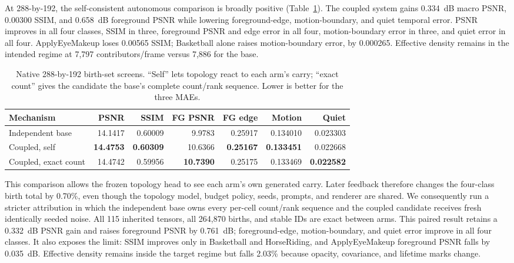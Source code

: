 \documentclass[10pt]{article}
\begin{document}
At 288-by-192, the self-consistent autonomous comparison is broadly positive
(Table~\ref{tab:coupledset}). The coupled system gains \SI{0.334}{dB} macro PSNR, 0.00300 SSIM,
and \SI{0.658}{dB} foreground PSNR while lowering foreground-edge, motion-boundary, and quiet
temporal error. PSNR improves in all four classes, SSIM in three, foreground PSNR and edge error in
all four, motion-boundary error in three, and quiet error in all four. ApplyEyeMakeup loses 0.00565
SSIM; Basketball alone raises motion-boundary error, by 0.000265. Effective density remains in the
intended regime at 7,797 contributors/frame versus 7,886 for the base.

\begin{table}[H]
\centering
\small
\caption{Native 288-by-192 birth-set screens. ``Self'' lets topology react to each arm's carry;
``exact count'' gives the candidate the base's complete count/rank sequence. Lower is better for
the three MAEs.}
\label{tab:coupledset}
\begin{tabular}{@{}lrrrrrr@{}}
\toprule
Mechanism & PSNR & SSIM & FG PSNR & FG edge & Motion & Quiet \\
\midrule
Independent base & 14.1417 & 0.60009 & 9.9783 & 0.25917 & 0.134010 & 0.023303 \\
Coupled, self & \textbf{14.4753} & \textbf{0.60309} & 10.6366 & \textbf{0.25167} & \textbf{0.133451} & 0.022668 \\
Coupled, exact count & 14.4742 & 0.59956 & \textbf{10.7390} & 0.25175 & 0.133469 & \textbf{0.022582} \\
\bottomrule
\end{tabular}
\end{table}

This comparison allows the frozen topology head to see each arm's own generated carry. Later
feedback therefore changes the four-class birth total by 0.70\%, even though the topology model,
budget policy, seeds, prompts, and renderer are shared. We consequently run a stricter attribution
in which the independent base owns every per-cell count/rank sequence and the coupled candidate
receives fresh identically seeded noise. All 115 inherited tensors, all 264,870 births, and stable
IDs are exact between arms. This paired result retains a \SI{0.332}{dB} PSNR gain and raises
foreground PSNR by \SI{0.761}{dB}; foreground-edge, motion-boundary, and quiet error improve in all
four classes. It also exposes the limit: SSIM improves only in Basketball and HorseRiding, and
ApplyEyeMakeup foreground PSNR falls by \SI{0.035}{dB}. Effective density remains inside the
target regime but falls 2.03\% because opacity, covariance, and lifetime marks change.
\end{document}
